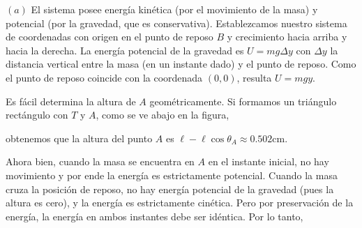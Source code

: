 \documentclass[12pt]{article}
\theoremstyle{definition}
\begin{document}
$(a)$ El sistema posee energía kinética (por el movimiento de la masa) y
potencial (por la gravedad, que es conservativa). Establezcamos nuestro sistema
de coordenadas con origen en el punto de reposo $B$ y crecimiento hacia arriba y
hacia la derecha. La energía potencial de la gravedad es $U = mg \Delta y$ con
$\Delta y$ la distancia vertical entre la masa (en un instante dado) y el punto
de reposo. Como el punto de reposo coincide con la coordenada $(0, 0)$, resulta
$U = mgy$.

Es fácil determina la altura de $A$ geométricamente. Si formamos un triángulo
rectángulo con $T$ y $A$, como se ve abajo en la figura,

    \begin{center}
\end{center}

obtenemos que la altura del punto $A$ es $\ell - \ell \cos \theta_A \approx
0.502\text{cm}$. 

Ahora bien, cuando la masa se encuentra en $A$ en el instante inicial, no hay
movimiento y por ende la energía es estrictamente potencial. Cuando la masa
cruza la posición de reposo, no hay energía potencial de la gravedad (pues la
altura es cero), y la energía es estrictamente cinética. Pero por preservación
de la energía, la energía en ambos instantes debe ser idéntica. Por lo tanto, 
\end{document}
